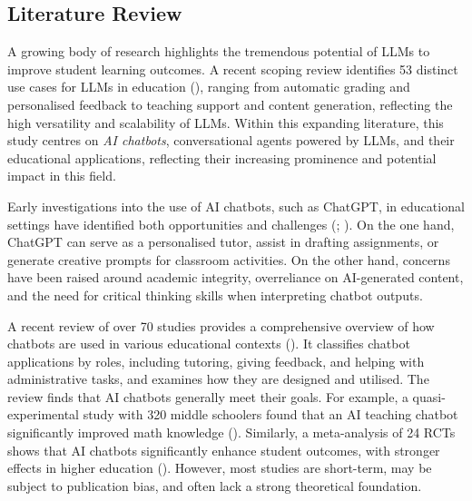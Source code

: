 \documentclass[
  12pt,
]{article}
\begin{document}
\subsection{Literature Review}\label{literature-review}

A growing body of research highlights the tremendous potential of LLMs to improve student learning outcomes. A recent scoping review identifies 53 distinct use cases for LLMs in education (), ranging from automatic grading and personalised feedback to teaching support and content generation, reflecting the high versatility and scalability of LLMs. Within this expanding literature, this study centres on \emph{AI chatbots}, conversational agents powered by LLMs, and their educational applications, reflecting their increasing prominence and potential impact in this field.

Early investigations into the use of AI chatbots, such as ChatGPT, in educational settings have identified both opportunities and challenges (; ). On the one hand, ChatGPT can serve as a personalised tutor, assist in drafting assignments, or generate creative prompts for classroom activities. On the other hand, concerns have been raised around academic integrity, overreliance on AI-generated content, and the need for critical thinking skills when interpreting chatbot outputs.

A recent review of over 70 studies provides a comprehensive overview of how chatbots are used in various educational contexts (). It classifies chatbot applications by roles, including tutoring, giving feedback, and helping with administrative tasks, and examines how they are designed and utilised. The review finds that AI chatbots generally meet their goals. For example, a quasi-experimental study with 320 middle schoolers found that an AI teaching chatbot significantly improved math knowledge (). Similarly, a meta-analysis of 24 RCTs shows that AI chatbots significantly enhance student outcomes, with stronger effects in higher education (). However, most studies are short-term, may be subject to publication bias, and often lack a strong theoretical foundation.
\end{document}
